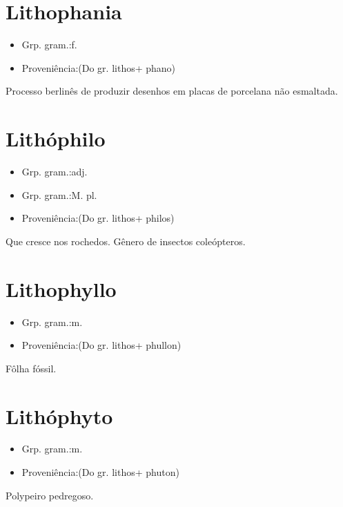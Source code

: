 \section{Lithophania}
\begin{itemize}
\item {Grp. gram.:f.}
\end{itemize}
\begin{itemize}
\item {Proveniência:(Do gr. \textunderscore lithos\textunderscore  + \textunderscore phano\textunderscore )}
\end{itemize}
Processo berlinês de produzir desenhos em placas de porcelana não esmaltada.
\section{Lithóphilo}
\begin{itemize}
\item {Grp. gram.:adj.}
\end{itemize}
\begin{itemize}
\item {Grp. gram.:M. pl.}
\end{itemize}
\begin{itemize}
\item {Proveniência:(Do gr. \textunderscore lithos\textunderscore  + \textunderscore philos\textunderscore )}
\end{itemize}
Que cresce nos rochedos.
Gênero de insectos coleópteros.
\section{Lithophyllo}
\begin{itemize}
\item {Grp. gram.:m.}
\end{itemize}
\begin{itemize}
\item {Proveniência:(Do gr. \textunderscore lithos\textunderscore  + \textunderscore phullon\textunderscore )}
\end{itemize}
Fôlha fóssil.
\section{Lithóphyto}
\begin{itemize}
\item {Grp. gram.:m.}
\end{itemize}
\begin{itemize}
\item {Proveniência:(Do gr. \textunderscore lithos\textunderscore  + \textunderscore phuton\textunderscore )}
\end{itemize}
Polypeiro pedregoso.
